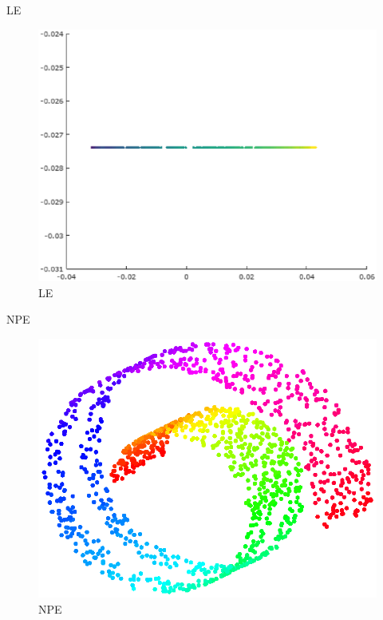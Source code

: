 \documentclass{beamer}
\begin{document}
\begin{darkframes}
   
   \begin{frame}{LE}
   \begin{figure}
   \centering
   \includegraphics[scale=0.4]{./figs/LE.eps}
   \caption{LE}
   \end{figure}
   \end{frame}
   
   \begin{frame}{NPE}
   \begin{figure}
   \centering
   \includegraphics[scale=0.5]{./figs/lle1.eps}
   \caption{NPE}
   \end{figure}
   \end{frame}
   

\end{darkframes}
\end{document}
